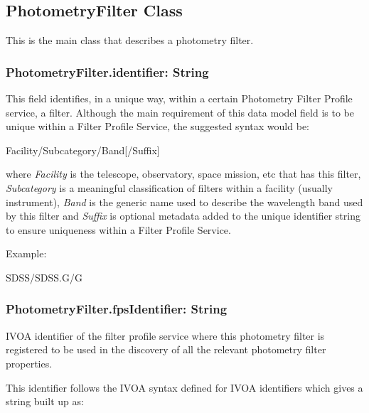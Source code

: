 \documentclass[11pt,a4paper]{ivoa}
\begin{document}
\subsection{PhotometryFilter Class}
This is the main class that describes a photometry filter.
\par

\subsubsection{PhotometryFilter.identifier: String}
This field identifies, in a unique way, within a certain Photometry 
Filter Profile service, a filter. Although the main requirement of 
this data model field is to be unique within a Filter Profile Service, 
the suggested syntax would be:
\par


Facility/Subcategory/Band[/Suffix]
\bigskip


where \textit{Facility} is the telescope, observatory, space mission, 
etc that has this filter, \textit{Subcategory} is a meaningful 
classification of filters within a facility (usually instrument), 
\textit{Band} is the generic name used to describe the wavelength 
band used by this filter and \textit{Suffix} is optional metadata added 
to the unique identifier string to ensure uniqueness within a Filter 
Profile Service.
\par

Example:
\par
SDSS/SDSS.G/G
\bigskip


\subsubsection{PhotometryFilter.fpsIdentifier: String}
IVOA identifier of the filter profile service where this photometry 
filter is registered to be used in the discovery of all the relevant 
photometry filter properties.
\par

This identifier follows the IVOA syntax defined for IVOA 
identifiers \citep{2016ivoa.spec.0523D} which gives a string built up as:
\par
\end{document}
